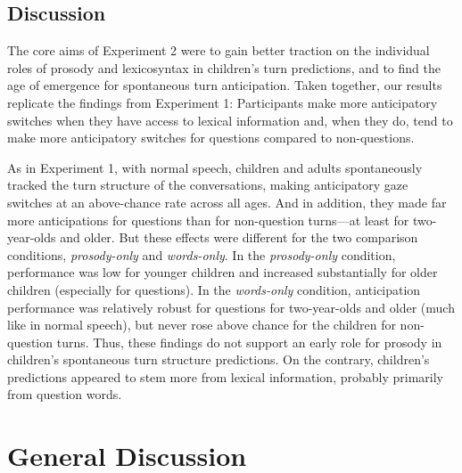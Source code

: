 \documentclass[authoryear, 12pt]{elsarticle}
\begin{document}
\subsection{Discussion}
\label{sec:discussion2}

The core aims of Experiment 2 were to gain better traction on the individual roles of prosody and lexicosyntax in children's turn predictions, and to find the age of emergence for spontaneous turn anticipation. Taken together, our results replicate the findings from Experiment 1: Participants make more anticipatory switches when they have access to lexical information and, when they do, tend to make more anticipatory switches for questions compared to non-questions. 

As in Experiment 1, with normal speech, children and adults spontaneously tracked the turn structure of the conversations, making anticipatory gaze switches at an above-chance rate across all ages. And in addition, they made far more anticipations for questions than for non-question turns---at least for two-year-olds and older. But these effects were different for the two comparison conditions, \textit{prosody-only} and \textit{words-only}. In the \textit{prosody-only} condition, performance was low for younger children and increased substantially for older children (especially for questions). In the \textit{words-only} condition, anticipation performance was relatively robust for questions for two-year-olds and older (much like in normal speech), but never rose above chance for the children for non-question turns. Thus, these findings do not support an early role for prosody in children's spontaneous turn structure predictions. On the contrary, children's predictions appeared to stem more from lexical information, probably primarily from question words.

\section{General Discussion}
\label{sec:gendisc}
\end{document}
